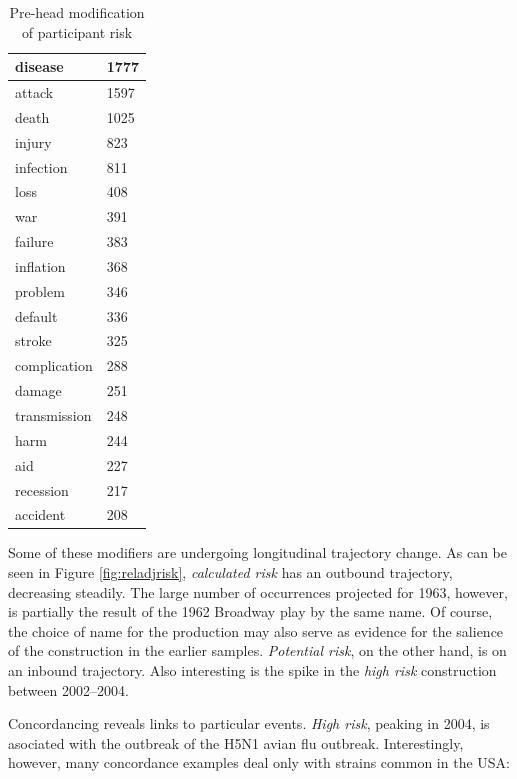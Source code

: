 \begin{table}
{\begin{minipage}{0.35\textwidth}
\begin{tabular}{|l|l|}
					disease            & 1777  \\ \hline
					attack             & 1597  \\ \hline
					death              & 1025  \\ \hline
					injury             & 823   \\ \hline
					infection          & 811   \\ \hline
					loss               & 408   \\ \hline
					war                & 391   \\ \hline
					failure            & 383   \\ \hline
					inflation          & 368   \\ \hline
					problem            & 346   \\ \hline
					default            & 336   \\ \hline
					stroke             & 325   \\ \hline
					complication       & 288   \\ \hline
					damage             & 251   \\ \hline
					transmission       & 248   \\ \hline
					harm               & 244   \\ \hline
					aid                & 227   \\ \hline
					recession          & 217   \\ \hline
					accident           & 208   \\ \hline
					\end{tabular}
					\caption{Pre-head modification of participant risk}
					\label{tab:posthead}
					\end{minipage}}
					\end{table}

				Some of these modifiers are undergoing longitudinal trajectory change. As can be seen in Figure \ref{fig:reladjrisk}, \emph{calculated risk} has an outbound trajectory, decreasing steadily. The large number of occurrences projected for 1963, however, is partially the result of the 1962 Broadway play by the same name. Of course, the choice of name for the production may also serve as evidence for the salience of the construction in the earlier samples.  \emph{Potential risk}, on the other hand, is on an inbound trajectory. Also interesting is the spike in the \emph{high risk} construction between 2002--2004. %

                Concordancing reveals links to particular events. \emph{High risk}, peaking in 2004, is asociated with the outbreak of the H5N1 avian flu outbreak. Interestingly, however, many concordance examples deal only with strains common in the USA:

